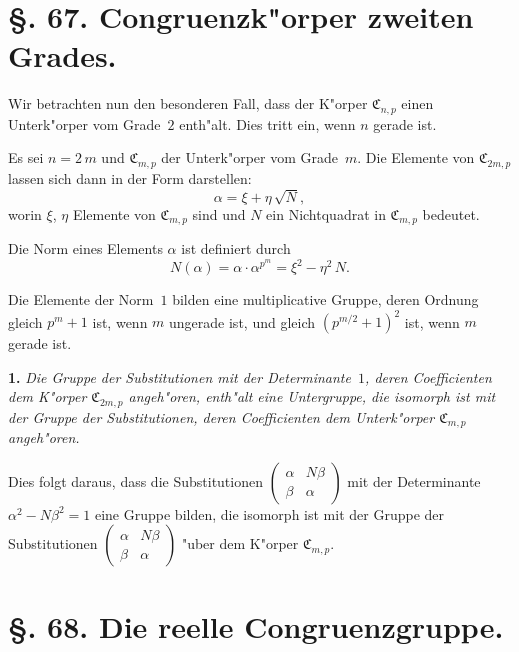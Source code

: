 \documentclass[12pt,a4paper]{article}
\theoremstyle{plain}
\theoremstyle{definition}
\theoremstyle{remark}
\begin{document}
\section*{\S. 67. Congruenzk"orper zweiten Grades.}

Wir betrachten nun den besonderen Fall, dass der K"orper $\mathfrak{C}_{n,p}$ einen Unterk"orper vom Grade~$2$ enth"alt. Dies tritt ein, wenn $n$ gerade ist.

Es sei $n = 2\,m$ und $\mathfrak{C}_{m,p}$ der Unterk"orper vom Grade~$m$. Die Elemente von $\mathfrak{C}_{2m,p}$ lassen sich dann in der Form darstellen:
\begin{equation}\tag{1}
\alpha = \xi + \eta\,\sqrt{N},
\end{equation}
worin $\xi$, $\eta$ Elemente von $\mathfrak{C}_{m,p}$ sind und $N$ ein Nichtquadrat in $\mathfrak{C}_{m,p}$ bedeutet.

Die Norm eines Elements $\alpha$ ist definiert durch
\begin{equation}\tag{2}
N(\alpha) = \alpha \cdot \alpha^{p^{m}} = \xi^{2} - \eta^{2}\,N.
\end{equation}

Die Elemente der Norm~$1$ bilden eine multiplicative Gruppe, deren Ordnung gleich $p^{m} + 1$ ist, wenn $m$ ungerade ist, und gleich $(p^{m/2} + 1)^{2}$ ist, wenn $m$ gerade ist.

\medskip\noindent\textbf{1.} \emph{Die Gruppe der Substitutionen mit der Determinante~$1$, deren Coefficienten dem K"orper $\mathfrak{C}_{2m,p}$ angeh"oren, enth"alt eine Untergruppe, die isomorph ist mit der Gruppe der Substitutionen, deren Coefficienten dem Unterk"orper $\mathfrak{C}_{m,p}$ angeh"oren.}

\smallskip
Dies folgt daraus, dass die Substitutionen $\begin{pmatrix} \alpha & N\beta \\ \beta & \alpha \end{pmatrix}$ mit der Determinante $\alpha^{2} - N\beta^{2} = 1$ eine Gruppe bilden, die isomorph ist mit der Gruppe der Substitutionen $\begin{pmatrix} \alpha & N\beta \\ \beta & \alpha \end{pmatrix}$ "uber dem K"orper $\mathfrak{C}_{m,p}$.

\section*{\S. 68. Die reelle Congruenzgruppe.}
\end{document}
